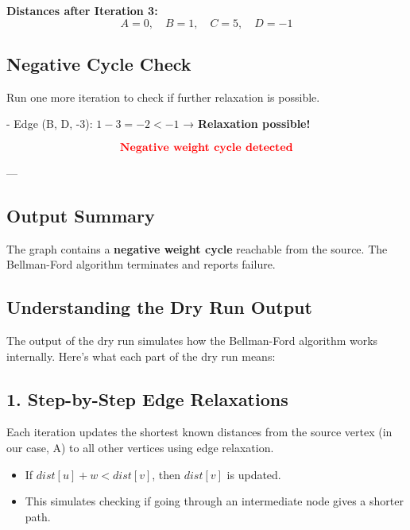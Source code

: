 \documentclass[14pt,a4paper]{extarticle}
\begin{document}
\textbf{Distances after Iteration 3:}
\[
A = 0,\quad B = 1,\quad C = 5,\quad D = -1
\]

\subsection*{Negative Cycle Check}

Run one more iteration to check if further relaxation is possible.

- Edge (B, D, -3): $1 - 3 = -2 < -1$ → \textbf{Relaxation possible!}

\[
\textcolor{red}{\textbf{Negative weight cycle detected}}
\]

---

\subsection*{Output Summary}

\begin{tcolorbox}[colback=gray!10, colframe=black, title=Result]
The graph contains a \textbf{negative weight cycle} reachable from the source. The Bellman-Ford algorithm terminates and reports failure.
\end{tcolorbox}


\subsection{Understanding the Dry Run Output}

The output of the dry run simulates how the Bellman-Ford algorithm works internally. Here's what each part of the dry run means:

\subsection*{1. Step-by-Step Edge Relaxations}

Each iteration updates the shortest known distances from the source vertex (in our case, A) to all other vertices using edge relaxation.

\begin{itemize}[leftmargin=1.5em]
    \item If $dist[u] + w < dist[v]$, then $dist[v]$ is updated.
    \item This simulates checking if going through an intermediate node gives a shorter path.
\end{itemize}
\end{document}
